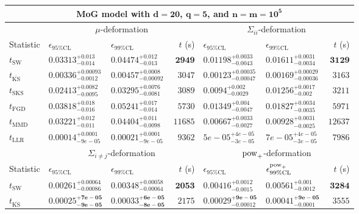 \begin{tabular}{l|llr|llr}
	\toprule
	\multicolumn{7}{c}{{\bf MoG model with $\mathbf{d=20}$, $\mathbf{q=5}$, and $\mathbf{n=m=10^{5}}$}} \\
	\toprule
	\multicolumn{1}{c}{} & \multicolumn{3}{c}{$\mu$-deformation} & \multicolumn{3}{c}{$\Sigma_{ii}$-deformation} \\
	Statistic & $\epsilon_{95\%\mathrm{CL}}$ & $\epsilon_{99\%\mathrm    {CL}}$ & $t$ (s) & $\epsilon_{95\%\mathrm{CL}}$ & $\epsilon_{99\%\mathrm{CL}}$ & $t$ (s) \\
	\midrule
	$t_{\mathrm{SW}}$ & $0.03313_{-0.014}^{+0.013}$ & $0.04474_{-0.013}^{+0.012}$ & ${\mathbf{2949}}$ & $0.01198_{-0.0043}^{+0.0033}$ & $0.01611_{-0.0034}^{+0.0031}$ & ${\mathbf{3129}}$ \\
	$t_{\overline{\mathrm{KS}}}$ & ${\mathbf{0.00336_{-0.0012}^{+0.00093}}}$ & ${\mathbf{0.00457_{-0.00092}^{+0.0008}}}$ & $3047$ & ${\mathbf{0.00123_{-0.00047}^{+0.00035}}}$ & ${\mathbf{0.00169_{-0.00036}^{+0.00029}}}$ & $3163$ \\
	$t_{\mathrm{SKS}}$ & $0.02413_{-0.0095}^{+0.0082}$ & $0.03295_{-0.0081}^{+0.0076}$ & $3089$ & $0.0094_{-0.0029}^{+0.002}$ & $0.01256_{-0.002}^{+0.0017}$ & $3211$ \\
	$t_{\mathrm{FGD}}$ & $0.03818_{-0.016}^{+0.018}$ & $0.05241_{-0.014}^{+0.017}$ & $5730$ & $0.01349_{-0.0047}^{+0.004}$ & $0.01827_{-0.0035}^{+0.0034}$ & $5971$ \\
	$t_{\mathrm{MMD}}$ & $0.03221_{-0.011}^{+0.012}$ & $0.04404_{-0.0098}^{+0.011}$ & $11685$ & $0.00667_{-0.0027}^{+0.0033}$ & $0.00928_{-0.0025}^{+0.0031}$ & $12637$ \\
	$t_{\mathrm{LLR}}$ & $0.00014_{-9e-05}^{+0.0001}$ & $0.00021_{-9e-05}^{+0.0001}$ & $9362$ & $5e-05_{-3e-05}^{+4e-05}$ & $7e-05_{-3e-05}^{+4e-05}$ & $7986$ \\
	\toprule
	\multicolumn{1}{c}{} & \multicolumn{3}{c}{$\Sigma_{i\neq j}$-deformation} & \multicolumn{3}{c}{$\rm{pow}_{+}$-deformation} \\
	Statistic & $\epsilon_{95\%\mathrm{CL}}$ & $\epsilon_{99\%\mathrm{CL}}$ & $t$ (s) & $\epsilon_{95\%\mathrm{CL}}$ & $\epsilon^{\rm   {pow}_{+}}_{99\%\mathrm{CL}}$ & $t$ (s) \\
	\midrule
	$t_{\mathrm{SW}}$ & $0.00261_{-0.00086}^{+0.00064}$ & $0.00348_{-0.00064}^{+0.00058}$ & ${\mathbf{2053}}$ & $0.00416_{-0.0015}^{+0.0012}$ & $0.00561_{-0.0012}^{+0.001}$ & ${\mathbf{3284}}$ \\
	$t_{\overline{\mathrm{KS}}}$ & ${\mathbf{0.00025_{-9e-05}^{+7e-05}}}$ & ${\mathbf{0.00033_{-8e-05}^{+6e-05}}}$ & $2175$ & ${\mathbf{0.00029_{-0.00012}^{+9e-05}}}$ & ${\mathbf{0.00041_{-0.0001}^{+9e-05}}}$ & $3555$ \\

\end{tabular}
